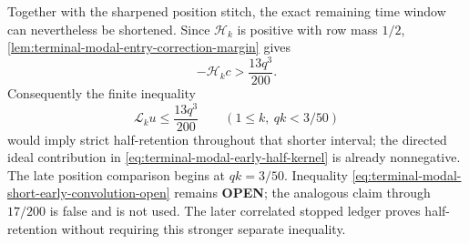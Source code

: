 Together with the sharpened position stitch, the exact remaining time window
can nevertheless be shortened.  Since $\mathcal H_k$ is positive with row
mass $1/2$, \cref{lem:terminal-modal-entry-correction-margin} gives
\begin{equation}
 -\mathcal H_kc>\frac{13q^3}{200}.
\end{equation}
Consequently the finite inequality
\begin{equation}
 \mathcal L_ku\le\frac{13q^3}{200}
 \qquad(1\le k,\ qk<3/50)
 \label{eq:terminal-modal-short-early-convolution-open}
\end{equation}
would imply strict half-retention throughout that shorter interval; the
directed ideal contribution in
\eqref{eq:terminal-modal-early-half-kernel} is already nonnegative.  The late
position comparison begins at $qk=3/50$.  Inequality
\eqref{eq:terminal-modal-short-early-convolution-open} remains
\textbf{OPEN}; the analogous claim through $17/200$ is false and is not
used.  The later correlated stopped ledger proves half-retention without
requiring this stronger separate inequality.
